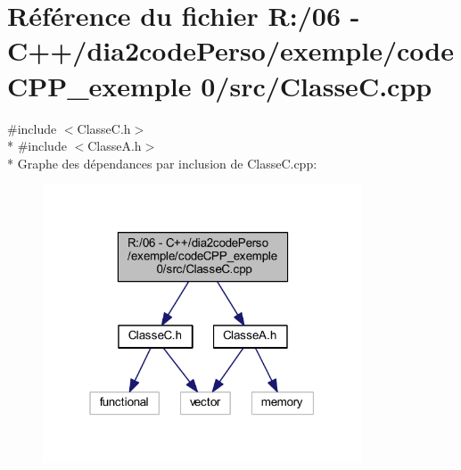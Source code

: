 \section{Référence du fichier R\+:/06 -\/ C++/dia2code\+Perso/exemple/code\+C\+P\+P\+\_\+exemple 0/src/\+Classe\+C.cpp}
\label{_classe_c_8cpp}
{\ttfamily \#include $<$Classe\+C.\+h$>$}\\*
{\ttfamily \#include $<$Classe\+A.\+h$>$}\\*
Graphe des dépendances par inclusion de Classe\+C.\+cpp\+:
\nopagebreak
\begin{figure}[H]
\begin{center}
\leavevmode
\includegraphics[width=268pt]{_classe_c_8cpp__incl}
\end{center}
\end{figure}
